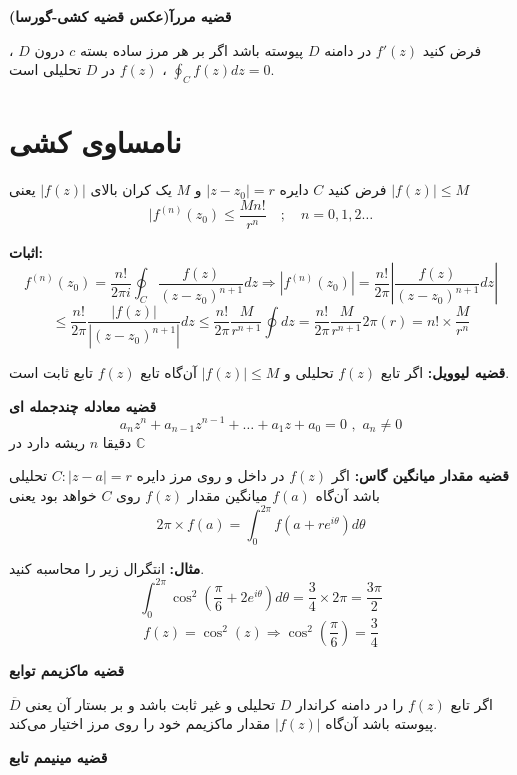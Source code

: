 \documentclass[12pt]{report}
\begin{document}
	\textbf{قضیه  مررآ(عکس قضیه کشی-گورسا)}
	
	فرض کنید
	$f'(z)$
	در دامنه 
	$D$
	پیوسته باشد اگر بر هر مرز ساده بسته 
	$c$
	درون 
	$D$
	،
	$\oint_{C} f(z) dz = 0$
	،
	$f(z)$
	در 
	$D$
	تحلیلی است.
	
	\section{نامساوی کشی}
	فرض کنید
	$C$
	دایره 
	$|z - z_0| = r$
	و 
	$M$
	یک کران بالای 
	$|f(z)|$
	یعنی 
	$|f(z)| \leq M$
	$$|f^{(n)}(z_0) \leq \frac{Mn!}{r^n} \quad ;\quad n = 0, 1,2 \dots $$
	
	\textbf{اثبات:}
	$$f^{(n)}(z_0) =\frac{n!}{2\pi i} \oint_{C} \frac{f(z)}{(z - z_0)^{n+1}}dz \Rightarrow |f^{(n)}(z_0)| =\frac{n!}{2\pi} |\frac{f(z)}{(z - z_0)^{n+1}}dz|$$
	$$\leq\frac{n!}{2\pi} \frac{|f(z)|}{|(z - z_0)^{n+1}|}dz \leq \frac{n!}{2\pi} \frac{M}{r^{n+1}}\oint dz = \frac{n!}{2\pi} \frac{M}{r^{n+1}} 2\pi(r) = n! \times \frac{M}{r^n}$$
	\newline
	
	\textbf{قضیه لیوویل:}
	اگر تابع
	$f(z)$
	تحلیلی و 
	$|f(z)| \leq M$
	آن‌گاه تابع 
	$f(z)$
	تابع ثابت است.
	\newline
	
	\textbf{قضیه معادله چندجمله ای}
	$$a_nz^n + a_{n -1}z ^{n-1} + \dots + a_1z + a_0 = 0 \,\,, \,\,a_n \neq 0$$
	دقیقا 
	$n$
	ریشه دارد در 
	$\mathbb{C}$
	\newline
	
	\textbf{قضیه مقدار میانگین گاس:}
	اگر 
	$f(z)$
	در داخل و روی مرز دایره
	$C :|z - a| = r$
	تحلیلی باشد آن‌گاه
	$f(a)$
	میانگین مقدار 
	$f(z)$
	روی 
	$C$
	خواهد بود یعنی
	$$2\pi \times f(a) = \int_{0}^{2\pi} f(a + re^{i\theta})d\theta$$
	\newline
	
	\textbf{مثال:}
	انتگرال زیر را محاسبه کنید.
	$$\int_{0}^{2\pi} \cos^2(\frac{\pi}{6} + 2e^{i\theta})d\theta=\frac{3}{4} \times 2\pi = \frac{3\pi}{2}$$
	$$f(z) = \cos^2(z) \Rightarrow \cos^2(\frac{\pi}{6}) = \frac{3}{4}$$
	\newline
	
	\textbf{قضیه ماکزیمم توابع}
	
	اگر تابع
	$f(z)$
	را در دامنه کراندار
	$D$
	تحلیلی و غیر ثابت باشد و بر بستار آن یعنی
	$\overline{D}$
	پیوسته باشد آن‌گاه
	$|f(z)|$
	مقدار ماکزیمم خود را روی مرز اختیار می‌کند.
	\newline
	
	\textbf{قضیه مینیمم تابع}
	
\end{document}
